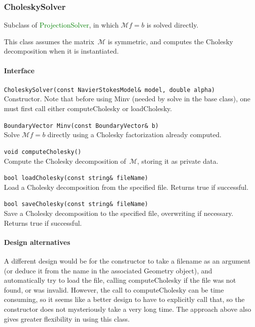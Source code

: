 \documentclass[11pt]{article}
\def\class#1{\textcolor{green}{\ttfamily\small #1}} %
\def\fn#1{{\ttfamily\small #1}} %
\let\code\lstinline
\begin{document}
\subsubsection{CholeskySolver}
Subclass of \class{ProjectionSolver}, in which $\mathcal{M}f=b$ is solved directly.

This class assumes the matrix~$\mathcal{M}$ is symmetric, and computes the Cholesky decomposition when it is instantiated.

\paragraph{Interface}
\begin{description}
	\item \code|CholeskySolver(const NavierStokesModel& model, double alpha)|\\
		Constructor.  Note that before using \fn{Minv} (needed by \fn{solve} in the base class), one must first call either \fn{computeCholesky} or \fn{loadCholesky}.
	\item \code|BoundaryVector Minv(const BoundaryVector& b)|\\
		Solve $\mathcal{M}f = b$ directly using a Cholesky factorization already computed.
	\item \code|void computeCholesky()|\\
		Compute the Cholesky decomposition of~$\mathcal{M}$, storing it as private data.
	\item \code|bool loadCholesky(const string& fileName)|\\
		Load a Cholesky decomposition from the specified file.  Returns true if successful.
	\item \code|bool saveCholesky(const string& fileName)|\\
		Save a Cholesky decomposition to the specified file, overwriting if necessary.  Returns true if successful.
\end{description}

\paragraph{Design alternatives}
A different design would be for the constructor to take a filename as an argument (or deduce it from the name in the associated Geometry object), and automatically try to load the file, calling \fn{computeCholesky} if the file was not found, or was invalid.  However, the call to \fn{computeCholesky} can be time consuming, so it seems like a better design to have to explicitly call that, so the constructor does not mysteriously take a very long time.  The approach above also gives greater flexibility in using this class.
\end{document}
